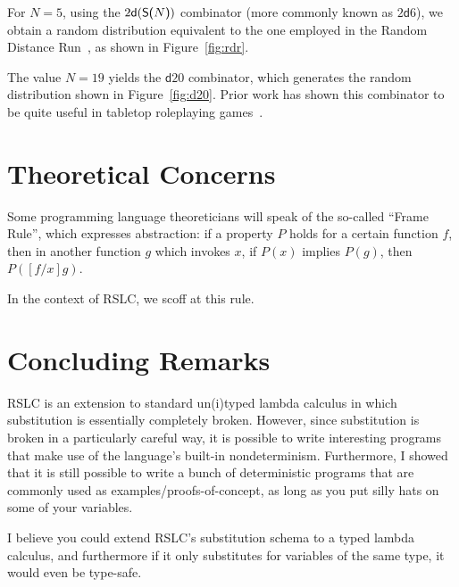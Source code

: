 \documentclass[10pt]{sigplanconf}
\begin{document}
For $N = 5$, using the $2\mathsf{d}(\textsf{S(}N\textsf{)})$ combinator (more commonly known as $2\mathsf{d}6$), we obtain a random distribution equivalent to the one employed in the Random Distance Run~\cite{rdr}, as shown in Figure~\ref{fig:rdr}.

The value $N = 19$ yields the $\mathsf{d}20$ combinator, which generates the random distribution shown in Figure~\ref{fig:d20}. Prior work has shown this combinator to be quite useful in tabletop roleplaying games~\cite{dnd-mm,dnd-phb,dnd-dmg}.

\section{Theoretical Concerns}

Some programming language theoreticians will speak of the so-called ``Frame Rule'', which expresses abstraction: if a property $P$ holds for a certain function $f$, then in another function $g$ which invokes $x$, if $P(x)$ implies $P(g)$, then $P([f/x]g)$.

In the context of RSLC, we scoff at this rule.

\section{Concluding Remarks}

RSLC is an extension to standard un(i)typed lambda calculus in which substitution is essentially completely broken. However, since substitution is broken in a particularly careful way, it is possible to write interesting programs that make use of the language's built-in nondeterminism.
Furthermore, I showed that it is still possible to write a bunch of deterministic programs that are commonly used as examples/proofs-of-concept, as long as you put silly hats on some of your variables.

I believe you could extend RSLC's substitution schema to a typed lambda calculus, and furthermore if it only substitutes for variables of the same type, it would even be type-safe.




\newpage

\appendix
\end{document}
